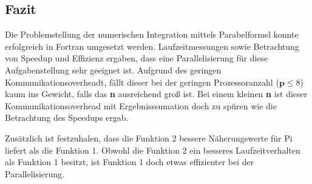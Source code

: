 \subsection{Fazit}
\label{ref:fazit}
Die Problemstellung der numerischen Integration mittels Parabelformel konnte erfolgreich in Fortran umgesetzt werden.
Laufzeitmessungen sowie Betrachtung von Speedup und Effizienz ergaben, dass eine Parallelisierung für diese Aufgabenstellung sehr geeignet ist.
Aufgrund des geringen Kommunikationsoverheadt, fällt dieser bei der geringen Prozessoranzahl ($\textbf{p} \le 8$) kaum ins Gewicht, falls das \textbf{n} ausreichend groß ist.
Bei einem kleinen \textbf{n} ist dieser Kommunikationsoverhead mit Ergebnisssumation doch zu spüren wie die Betrachtung des Speedups ergab.

Zusätzlich ist festzuhalen, dass die Funktion 2 bessere Näherungswerte für Pi liefert als die Funktion 1.
Obwohl die Funktion 2 ein besseres Laufzeitverhalten als Funktion 1 besitzt, ist Funktion 1 doch etwas effizienter bei der Parallelisierung.


